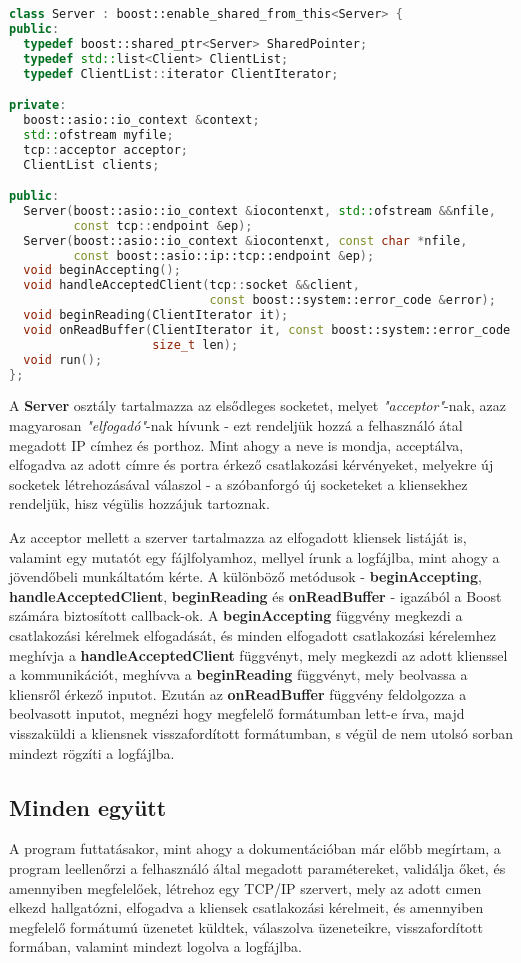 \documentclass[openany,10pt,a4paper]{book}
\begin{document}
\begin{lstlisting}[language=C++]
class Server : boost::enable_shared_from_this<Server> {
public:
  typedef boost::shared_ptr<Server> SharedPointer;
  typedef std::list<Client> ClientList;
  typedef ClientList::iterator ClientIterator;

private:
  boost::asio::io_context &context;
  std::ofstream myfile;
  tcp::acceptor acceptor;
  ClientList clients;

public:
  Server(boost::asio::io_context &iocontenxt, std::ofstream &&nfile,
         const tcp::endpoint &ep);
  Server(boost::asio::io_context &iocontenxt, const char *nfile,
         const boost::asio::ip::tcp::endpoint &ep);
  void beginAccepting();
  void handleAcceptedClient(tcp::socket &&client,
                            const boost::system::error_code &error);
  void beginReading(ClientIterator it);
  void onReadBuffer(ClientIterator it, const boost::system::error_code &ec,
                    size_t len);
  void run();
};
\end{lstlisting}

A \textbf{Server} osztály tartalmazza az elsődleges socketet, melyet \textit{"acceptor"}-nak, azaz magyarosan \textit{"elfogadó"}-nak hívunk - ezt rendeljük hozzá a felhasználó átal megadott IP címhez és porthoz. Mint ahogy a neve is mondja, acceptálva, elfogadva az adott címre és portra érkező csatlakozási kérvényeket, melyekre új socketek létrehozásával válaszol - a szóbanforgó új socketeket a kliensekhez rendeljük, hisz végülis hozzájuk tartoznak.

Az acceptor mellett a szerver tartalmazza az elfogadott kliensek listáját is, valamint egy mutatót egy fájlfolyamhoz, mellyel írunk a logfájlba, mint ahogy a jövendőbeli munkáltatóm kérte. A különböző metódusok - \textbf{beginAccepting}, \textbf{handleAcceptedClient}, \textbf{beginReading} és \textbf{onReadBuffer} - igazából a Boost számára biztosított callback-ok. A \textbf{beginAccepting} függvény megkezdi a csatlakozási kérelmek elfogadását, és minden elfogadott csatlakozási kérelemhez meghívja a \textbf{handleAcceptedClient} függvényt, mely megkezdi az adott klienssel a kommunikációt, meghívva a \textbf{beginReading} függvényt, mely beolvassa a kliensről érkező inputot. Ezután az \textbf{onReadBuffer} függvény feldolgozza a beolvasott inputot, megnézi hogy megfelelő formátumban lett-e írva, majd visszaküldi a kliensnek visszafordított formátumban, s végül de nem utolsó sorban mindezt rögzíti a logfájlba.

\subsection{Minden együtt}

A program futtatásakor, mint ahogy a dokumentációban már előbb megírtam, a program leellenőrzi a felhasználó által megadott paramétereket, validálja őket, és amennyiben megfelelőek, létrehoz egy TCP/IP szervert, mely az adott cımen elkezd hallgatózni, elfogadva a kliensek csatlakozási kérelmeit, és amennyiben megfelelő formátumú üzenetet küldtek, válaszolva üzeneteikre, visszafordított formában, valamint mindezt logolva a logfájlba.
\end{document}
